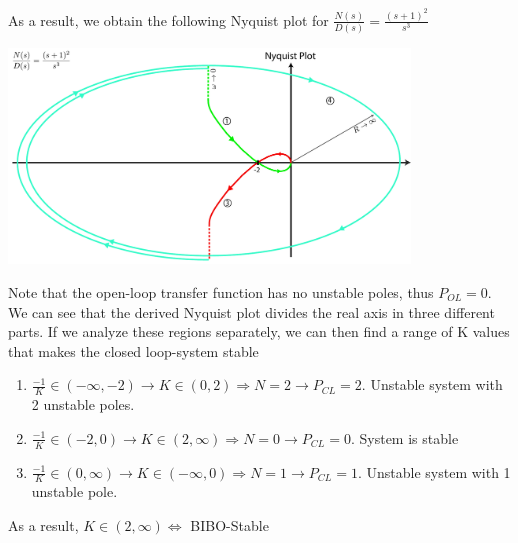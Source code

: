 \documentclass[twoside]{article}
\begin{document}
As a result, we obtain the following Nyquist plot for
$\frac{N(s)}{D(s)} = \frac{(s+1)^2}{s^3}$

\vspace{6 pt}

  \begin{minipage}[h]{1\linewidth}
    \begin{center}
      \includegraphics[width=0.8\textwidth]{ex6}
    \end{center}
  \end{minipage}

\vspace{6 pt}

Note that the open-loop transfer function has no unstable poles,
thus $P_{OL} = 0$. We can see that the derived Nyquist plot divides the real axis in
three different parts. If we analyze  these regions separately, we can 
then find a range of K values that makes the closed loop-system stable
%
\begin{enumerate}
  \item $\frac{-1}{K} \in (-\infty , - 2) \rightarrow K \in (0 , 2) \Rightarrow N = 2 \rightarrow P_{CL} = 2 $. Unstable system with
    2 unstable poles. 
  \item $\frac{-1}{K} \in (-2 , 0) \rightarrow K \in (2 , \infty)
    \Rightarrow N = 0 \rightarrow P_{CL} = 0 $. System is stable
    \item $\frac{-1}{K} \in (0,\infty) \rightarrow K \in (-\infty , 0)
    \Rightarrow N = 1 \rightarrow P_{CL} = 1 $. Unstable system with
    1 unstable pole. 
\end{enumerate}
%
As a result, $K \in (2 , \infty) \Leftrightarrow $ BIBO-Stable


\end{document}
